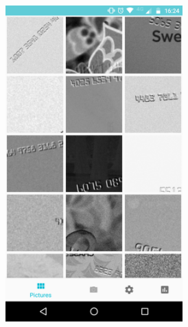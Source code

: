 \begin{figure}[]
	\centering 
	\begin{subfigure}[p]{0.45\textwidth}
	  \centering
	  \includegraphics[width=0.75\textwidth]{img/app/main.png}
	  \label{fig:MainActivity}
	\end{subfigure}
	\quad
	\begin{subfigure}[p]{0.45\textwidth}
	  \centering

\end{subfigure}
\end{figure}
